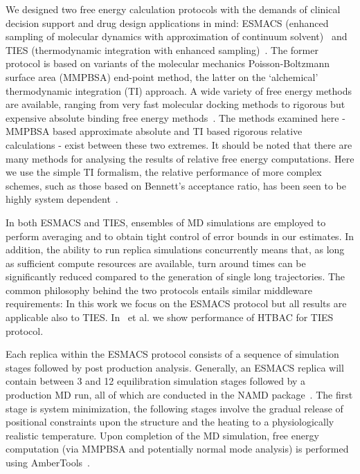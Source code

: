 \documentclass{bmcart}
\begin{document}
We designed two free energy calculation protocols with the demands of clinical
decision support and drug design applications in mind: ESMACS (enhanced
sampling of molecular dynamics with approximation of continuum
solvent)~\cite{Wan2017brd4} and TIES (thermodynamic integration with enhanced
sampling)~\cite{Bhati2017}. The former protocol is based on variants of the
molecular mechanics Poisson-Boltzmann surface area (MMPBSA) end-point method,
the latter on the `alchemical' thermodynamic integration (TI) approach. 
 A wide variety of free energy methods are available, ranging from very fast molecular docking 
 methods to rigorous but expensive absolute binding free energy methods~\cite{Mobley2009}. The methods examined here 
 - MMPBSA based approximate absolute and TI based rigorous relative calculations - 
 exist between these two extremes.  It should be noted that there are many methods for analysing 
 the results of relative free energy  computations. 
 Here we use the simple TI formalism, the relative performance of more complex schemes, such as those based 
 on Bennett's acceptance ratio, has been seen to be highly system dependent~\cite{Ruiter2013, Christ2014, Bhati2018}.

In
both ESMACS and TIES, ensembles of MD simulations are employed to perform averaging and
to obtain tight control of error bounds in our estimates. In addition, the
ability to run replica simulations concurrently means that, as long as
sufficient compute resources are available, turn around times can be
significantly reduced compared to the generation of single long trajectories.
The common philosophy behind the two protocols entails similar middleware
requirements: In this work we focus on the ESMACS protocol but all results are
applicable also to TIES. In~\cite{dakka} et al. we show performance of HTBAC for
TIES protocol. 

Each replica within the ESMACS protocol consists of a sequence of simulation
stages followed by post production analysis. Generally, an ESMACS replica will
contain between 3 and 12 equilibration simulation stages followed by a
production MD run, all of which are conducted in the NAMD
package~\cite{Phillips2005}. The first stage is system minimization, the
following stages involve the gradual release of positional constraints upon
the structure and the heating to a physiologically realistic temperature.
Upon completion of the MD simulation, free energy computation (via MMPBSA and
potentially normal mode analysis) is performed using
AmberTools~\cite{Case2005, MillerIII2012}.
\end{document}
